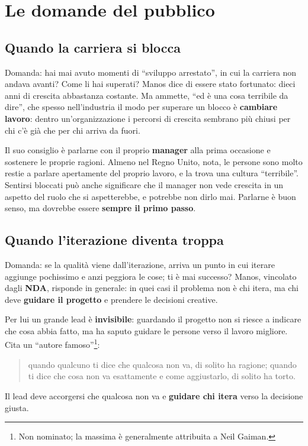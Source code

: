 \section{Le domande del pubblico}
\label{sec:c2-6-domande}

\subsection{Quando la carriera si blocca}

Domanda: hai mai avuto momenti di ``sviluppo arrestato'', in cui la carriera non
andava avanti? Come li hai superati? Manos dice di essere stato fortunato: dieci
anni di crescita abbastanza costante. Ma ammette, ``ed è una cosa terribile da
dire'', che spesso nell'industria il modo per superare un blocco è
\textbf{cambiare lavoro}: dentro un'organizzazione i percorsi di crescita sembrano
più chiusi per chi c'è già che per chi arriva da fuori.

Il suo consiglio è parlarne con il proprio \textbf{manager} alla prima occasione e
sostenere le proprie ragioni. Almeno nel Regno Unito, nota, le persone sono molto
restie a parlare apertamente del proprio lavoro, e la trova una cultura
``terribile''. Sentirsi bloccati può anche significare che il manager non vede
crescita in un aspetto del ruolo che si aspetterebbe, e potrebbe non dirlo mai.
Parlarne è buon senso, ma dovrebbe essere \textbf{sempre il primo passo}.

\subsection{Quando l'iterazione diventa troppa}

Domanda: se la qualità viene dall'iterazione, arriva un punto in cui iterare
aggiunge pochissimo e anzi peggiora le cose; ti è mai successo? Manos, vincolato
dagli \textbf{NDA}, risponde in generale: in quei casi il problema non è chi itera,
ma chi deve \textbf{guidare il progetto} e prendere le decisioni creative.

Per lui un grande lead è \textbf{invisibile}: guardando il progetto non si riesce a
indicare che cosa abbia fatto, ma ha saputo guidare le persone verso il lavoro
migliore. Cita un ``autore famoso''\footnote{Non nominato; la massima è
generalmente attribuita a Neil Gaiman.}:
\begin{quote}
quando qualcuno ti dice che qualcosa non va, di solito ha ragione; quando ti dice
che cosa non va esattamente e come aggiustarlo, di solito ha torto.
\end{quote}
Il lead deve accorgersi che qualcosa non va e \textbf{guidare chi itera} verso la
decisione giusta.

